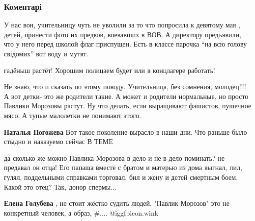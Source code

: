  
 
 
 
 
\subsubsection{Коментарі}
\label{sec:04_12_2021.fb.fb_group.velikaja_otechestvennaja_infvojna.1.kiev_uchenik_stukach.cmt}

\begin{itemize} %

У нас вон, учительницу чуть не уволили за то что попросила к девятому мая
, детей, принести фото их предков, воевавших в ВОВ. А директору предъявили, что
у него перед школой флаг приспущен. Есть в классе парочка \enquote{на всю
голову свідомих} вот воду и мутят.


гадёныш растёт! Хорошим полицаем будет или в концлагере работать!


Не знаю, что и сказать по этому поводу. Учительница, без сомнения, молодец!!!!
А вот детки- это же родители такие. А может и родители нормальные, но просто Павлики Морозовы растут.
Ну что делать, если выращивают фашистов, пушечное мясо. А тупые малолетки не понимают этого.

\begin{itemize} %
\textbf{Наталья Погожева} Вот такое поколение вырасло в наши дни. Что раньше было стыдно и наказуемо сейчас В ТЕМЕ


да сколько же можно Павлика Морозова в дело и не в дело поминать? не предавал
он отца! Его папаша вместе с братом и матерью из дома выгнал, пил, гулял,
поддельными справками торговал, бил и жену и детей смертным боем. Какой это
отец? Так, донор спермы...

\textbf{Елена Голубева} , не стоит жёстко судить людей. "Павлик Морозов" это не конкретный человек, а образ, \#....  @igg{fbicon.wink} 
\end{itemize} %


\end{itemize}

